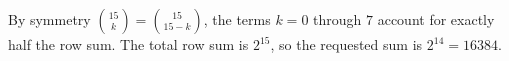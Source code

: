 By symmetry $\binom{15}{k}=\binom{15}{15-k}$, the terms $k=0$ through $7$ account for exactly half the row sum. The total row sum is $2^{15}$, so the requested sum is $\boxed{2^{14}=16384}$.
